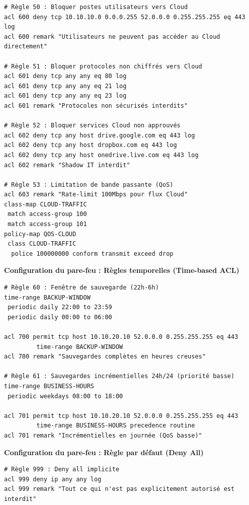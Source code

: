 \begin{verbatim}
# Règle 50 : Bloquer postes utilisateurs vers Cloud
acl 600 deny tcp 10.10.10.0 0.0.0.255 52.0.0.0 0.255.255.255 eq 443 log
acl 600 remark "Utilisateurs ne peuvent pas accéder au Cloud directement"

# Règle 51 : Bloquer protocoles non chiffrés vers Cloud
acl 601 deny tcp any any eq 80 log
acl 601 deny tcp any any eq 21 log
acl 601 deny tcp any any eq 23 log
acl 601 remark "Protocoles non sécurisés interdits"

# Règle 52 : Bloquer services Cloud non approuvés
acl 602 deny tcp any host drive.google.com eq 443 log
acl 602 deny tcp any host dropbox.com eq 443 log
acl 602 deny tcp any host onedrive.live.com eq 443 log
acl 602 remark "Shadow IT interdit"

# Règle 53 : Limitation de bande passante (QoS)
acl 603 remark "Rate-limit 100Mbps pour flux Cloud"
class-map CLOUD-TRAFFIC
 match access-group 100
 match access-group 101
policy-map QOS-CLOUD
 class CLOUD-TRAFFIC
  police 100000000 conform transmit exceed drop
\end{verbatim}

\medskip

\noindent \textbf{Configuration du pare-feu : Règles temporelles (Time-based ACL)}

\begin{verbatim}
# Règle 60 : Fenêtre de sauvegarde (22h-6h)
time-range BACKUP-WINDOW
 periodic daily 22:00 to 23:59
 periodic daily 00:00 to 06:00

acl 700 permit tcp host 10.10.20.10 52.0.0.0 0.255.255.255 eq 443 
         time-range BACKUP-WINDOW
acl 700 remark "Sauvegardes complètes en heures creuses"

# Règle 61 : Sauvegardes incrémentielles 24h/24 (priorité basse)
time-range BUSINESS-HOURS
 periodic weekdays 08:00 to 18:00

acl 701 permit tcp host 10.10.20.10 52.0.0.0 0.255.255.255 eq 443 
         time-range BUSINESS-HOURS precedence routine
acl 701 remark "Incrémentielles en journée (QoS basse)"
\end{verbatim}

\newpage

\noindent \textbf{Configuration du pare-feu : Règle par défaut (Deny All)}

\begin{verbatim}
# Règle 999 : Deny all implicite
acl 999 deny ip any any log
acl 999 remark "Tout ce qui n'est pas explicitement autorisé est interdit"
\end{verbatim}

